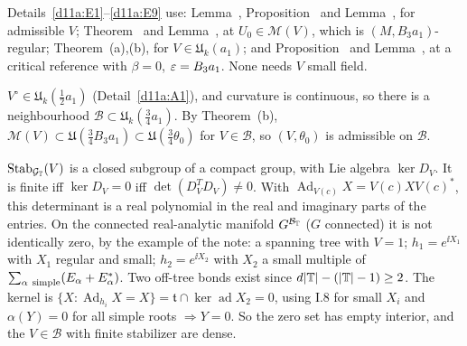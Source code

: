\begin{detail}\label{d11a:E11}
\begin{step}
Details~\ref{d11a:E1}--\ref{d11a:E9} use: Lemma~, Proposition~ and Lemma~, for admissible $V$; Theorem~ and Lemma~, at $U_0\in\mathscr M(V)$, which is $(M,B_3a_1)$-regular; Theorem~(a),(b), for $V\in\mathfrak U_k(a_1)$; and Proposition~ and Lemma~, at a critical reference with $\beta=0$, $\varepsilon=B_3a_1$. None needs $V$ small field.
\end{step}
\begin{step}
$V^\circ\in\mathfrak U_k(\frac12a_1)$ (Detail~\ref{d11a:A1}), and curvature is continuous, so there is a neighbourhood $\mathcal B\subset\mathfrak U_k(\frac34a_1)$. By Theorem~(b), $\mathscr M(V)\subset\mathfrak U(\frac34B_3a_1)\subset\mathfrak U(\frac34\theta_0)$ for $V\in\mathcal B$, so $(V,\theta_0)$ is admissible on $\mathcal B$.
\end{step}
\begin{step}[Density]
$\operatorname{Stab}_{\mathcal G_\mathbb T}(V)$ is a closed subgroup of a compact group, with Lie algebra $\ker D_V$. It is finite iff $\ker D_V=0$ iff $\det(D_V^TD_V)\ne0$. With $\operatorname{Ad}_{V(c)}X=V(c)XV(c)^*$, this determinant is a real polynomial in the real and imaginary parts of the entries. On the connected real-analytic manifold $G^{\mathcal B_\mathbb T}$ ($G$ connected) it is not identically zero, by the example of the note: a spanning tree with $V=1$; $h_1=e^{\ii X_1}$ with $X_1$ regular and small; $h_2=e^{\ii X_2}$ with $X_2$ a small multiple of $\sum_{\alpha\ \rm simple}(E_\alpha+E_\alpha^*)$. Two off-tree bonds exist since $d|\mathbb T|-(|\mathbb T|-1)\ge2$. The kernel is $\{X:\operatorname{Ad}_{h_i}X=X\}=\mathfrak t\cap\ker\operatorname{ad}X_2=0$, using I.8 for small $X_i$ and $\alpha(Y)=0$ for all simple roots $\Rightarrow Y=0$. So the zero set has empty interior, and the $V\in\mathcal B$ with finite stabilizer are dense.
\end{step}
\begin{step}

\end{step}
\end{detail}
